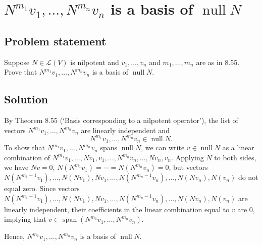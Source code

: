 \documentclass{article}
\begin{document}
\clearpage

\section{$N^{m_1}v_1,\ldots,N^{m_n}v_n$ is a basis of $\operatorname{null}N$}
\subsection*{Problem statement}
Suppose $N\in\mathcal{L}(V)$ is nilpotent and $v_1,\ldots,v_n$ and $m_1,\ldots,m_n$ are as in 8.55. 
Prove that $N^{m_1}v_1,\ldots,N^{m_n}v_n$ is a basis of $\operatorname{null}N$.

\subsection*{Solution}
By Theorem 8.55 (`Basis corresponding to a nilpotent operator'), the list of vectors $N^{m_1}v_1,\ldots,N^{m_n}v_n$ are linearly independent and
\[N^{m_1}v_1,\ldots,N^{m_n}v_n\in\operatorname{null}N.\]
To show that $N^{m_1}v_1,\ldots,N^{m_n}v_n$ spans $\operatorname{null}N$, we can write $v\in\operatorname{null}N$ as a linear combination of $N^{m_1}v_1,\ldots,Nv_1,v_1,\ldots,N^{m_n}v_n,\ldots,Nv_n,v_n$. 
Applying $N$ to both sides, we have $Nv=0$, $N(N^{{m_1}}v_1)=\cdots=N(N^{{m_n}}v_n)=0$, but vectors $N(N^{{m_1-1}}v_1),\ldots,N(Nv_1),Nv_1,\ldots,N(N^{m_n-1}v_n),\ldots,N(Nv_n),N(v_n)$ do not equal zero. 
Since vectors \newline
$N(N^{{m_1-1}}v_1),\ldots,N(Nv_1),Nv_1,\ldots,N(N^{m_n-1}v_n),\ldots,N(Nv_n),N(v_n)$ are linearly independent, their coefficients in the linear combination equal to $v$ are $0$, implying that $v\in\operatorname{span}(N^{m_1}v_1,\ldots,N^{m_n}v_n)$.

Hence, $N^{m_1}v_1,\ldots,N^{m_n}v_n$ is a basis of $\operatorname{null}N$.
\end{document}
